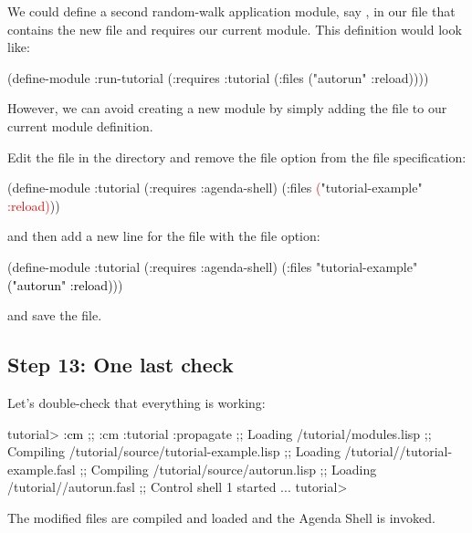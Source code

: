 \documentclass[10pt,twoside,english,pdftex]{article}
\begin{document}
We could define a second random-walk application module, say
, in our  file that
contains the new  file and requires our current
 module.  This definition would look like:
%
\W\supp
\begin{example}
\textcolor{darkergray}{%
  (define-module :run-tutorial
    (:requires :tutorial
    (:files ("autorun" :reload))))}
\end{example}
%
However, we can avoid creating a new module by simply adding the
 file to our current  module definition.  

Edit the  file in the  directory and
remove the  file option from the 
file specification:
%
\W\supp
\begin{example}
\textcolor{darkergray}{%
  (define-module :tutorial
    (:requires :agenda-shell)
    (:files \textcolor{red}{(}"tutorial-example" \textcolor{red}{:reload)}))}
\end{example}
%
and then add a new line for the  file with the 
file option:
%
\W\supp\notpretop
\begin{example}
\textcolor{darkergray}{%
  (define-module :tutorial
    (:requires :agenda-shell)
    (:files "tutorial-example"
            \textcolor{black}{("autorun" :reload)}))}
\end{example}
%
and save the file.

\subsection*{Step 13: One last check}

Let's double-check that everything is working:
%
\W\supp
\begin{smallexample}
\textcolor{darkergray}{%
  tutorial> \textcolor{black}{:cm}
  ;; :cm :tutorial :propagate
  ;; Loading /tutorial/modules.lisp
  ;; Compiling /tutorial/source/tutorial-example.lisp
  ;; Loading /tutorial//tutorial-example.fasl
  ;; Compiling /tutorial/source/autorun.lisp
  ;; Loading /tutorial//autorun.fasl
  ;; Control shell 1 started
     ...
  tutorial>}
\end{smallexample}
%
The modified files are compiled and loaded and the Agenda Shell is invoked.
\end{document}
